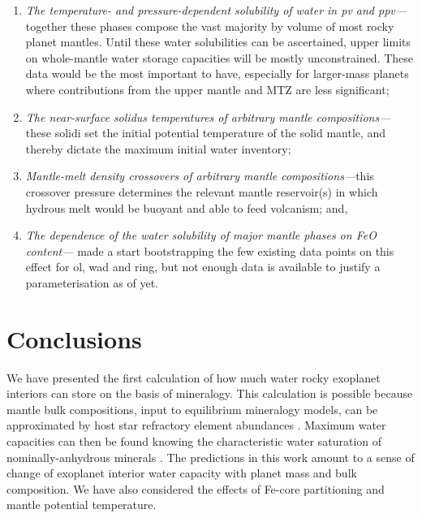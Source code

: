 \begin{enumerate}
    \item \textit{The temperature- and pressure-dependent solubility of water in pv and ppv---}together these phases compose the vast majority by volume of most rocky planet mantles. Until these water solubilities can be ascertained, upper limits on whole-mantle water storage capacities will be mostly unconstrained. These data would be the most important to have, especially for larger-mass planets where contributions from the upper mantle and MTZ are less significant; 
    \item \textit{The near-surface solidus temperatures of arbitrary mantle compositions---}these solidi set the initial potential temperature of the solid mantle, and thereby dictate the maximum initial water inventory;
    \item \textit{Mantle-melt density crossovers of arbitrary mantle compositions---}this crossover pressure determines the relevant mantle reservoir(s) in which hydrous melt would be buoyant and able to feed volcanism; and,
    \item \textit{The dependence of the water solubility of major mantle phases on FeO content---}\citet{dong_water_2022} made a start bootstrapping the few existing data points on this effect for ol, wad and ring, but not enough data is available to justify a parameterisation as of yet. 
\end{enumerate}





\section{Conclusions}

We have presented the first calculation of how much water rocky exoplanet interiors can store on the basis of mineralogy. This calculation is possible because mantle bulk compositions, input to equilibrium mineralogy models, can be approximated by host star refractory element abundances \citep{anders_solarsystem_1982, thiabaud_elemental_2015, bonsor_hoststar_2021}. Maximum water capacities can then be found knowing the characteristic water saturation of nominally-anhydrous minerals \citep{keppler_thermodynamics_2006}. The predictions in this work amount to a sense of change of exoplanet interior water capacity with planet mass and bulk composition. We have also considered the effects of Fe-core partitioning and mantle potential temperature.

